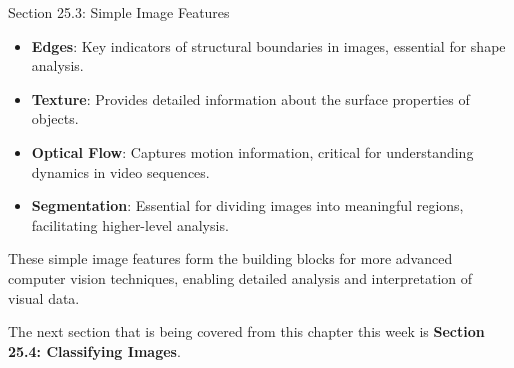 \begin{notes}{Section 25.3: Simple Image Features}
\begin{highlight}
        \begin{itemize}
            \item \textbf{Edges}: Key indicators of structural boundaries in images, essential for shape analysis.
            \item \textbf{Texture}: Provides detailed information about the surface properties of objects.
            \item \textbf{Optical Flow}: Captures motion information, critical for understanding dynamics in video sequences.
            \item \textbf{Segmentation}: Essential for dividing images into meaningful regions, facilitating higher-level analysis.
        \end{itemize}
    
        These simple image features form the building blocks for more advanced computer vision techniques, enabling detailed analysis and interpretation of visual data.
    
    \end{highlight}
\end{notes}

The next section that is being covered from this chapter this week is \textbf{Section 25.4: Classifying Images}.

